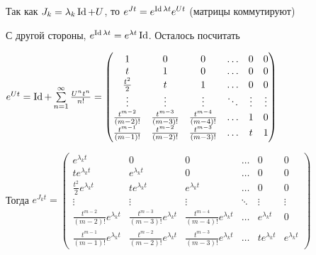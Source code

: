 \documentclass[12pt]{article}
\begin{document}
\begin{nota}{}
    Так как $J_k = \lambda_k\operatorname{Id} + U$, то $e^{Jt} = e^{\operatorname{Id}\lambda t} e^{Ut}$ (матрицы коммутируют)

    С другой стороны, $e^{\operatorname{Id}\lambda t} = e^{\lambda t}\operatorname{Id}$. Осталось посчитать

    $e^{Ut} = \operatorname{Id} + \sum\limits_{n = 1}^\infty \frac{U^nt^n}{n!} = \begin{pmatrix}
        1 & 0 & 0 & \ldots & 0 & 0 \\
        t & 1 & 0 & \ldots & 0 & 0 \\
        \frac{t^2}{2} & t & 1 & \ldots & 0 & 0 \\
        \vdots & \vdots & \vdots & \ddots & \vdots & \vdots \\
        \frac{t^{m - 2}}{(m - 2)!} & \frac{t^{m - 3}}{(m - 3)!} & \frac{t^{m - 4}}{(m - 4)!} & \ldots & 1 & 0 \\
        \frac{t^{m - 1}}{(m - 1)!} & \frac{t^{m - 2}}{(m - 2)!} & \frac{t^{m - 3}}{(m - 3)!} & \ldots & t & 1
    \end{pmatrix}$

    Тогда $e^{J_kt} = \begin{pmatrix}
        e^{\lambda_k t} & 0 & 0 & \ldots & 0 & 0 \\
        t e^{\lambda_k t} & e^{\lambda_k t} & 0 & \ldots & 0 & 0 \\
        \frac{t^2}{2} e^{\lambda_k t} & t e^{\lambda_k t} & e^{\lambda_k t} & \ldots & 0 & 0 \\
        \vdots & \vdots & \vdots & \ddots & \vdots & \vdots \\
        \frac{t^{m - 2}}{(m - 2)!} e^{\lambda_k t} & \frac{t^{m - 3}}{(m - 3)!} e^{\lambda_k t} & \frac{t^{m - 4}}{(m - 4)!} e^{\lambda_k t} & \ldots & e^{\lambda_k t} & 0 \\
        \frac{t^{m - 1}}{(m - 1)!} e^{\lambda_k t} & \frac{t^{m - 2}}{(m - 2)!} e^{\lambda_k t} & \frac{t^{m - 3}}{(m - 3)!} e^{\lambda_k t} & \ldots & t e^{\lambda_k t} & e^{\lambda_k t}
    \end{pmatrix}$
\end{nota}
\end{document}
